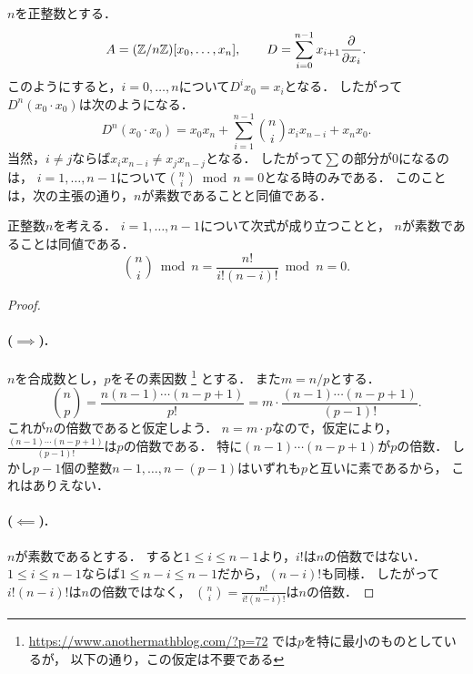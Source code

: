 \documentclass[a4paper]{jsarticle}
\begin{document}
\begin{Example}
    $n$を正整数とする．
    \[
        A=(\mathbb{Z}/n\mathbb{Z})[x_0,\dots,x_n],
        \hspace{20pt}
        D=\sum_{i=0}^{n-1} x_{i+1} \frac{\partial}{\partial x_{i}}.
    \]
    このようにすると，$i=0,\dots,n$について$D^i x_0=x_{i}$となる．
    したがって$D^n(x_0 \cdot x_0)$は次のようになる．
    \[ D^n(x_0 \cdot x_0)=x_0 x_n + \sum_{i=1}^{n-1} \binom{n}{i} x_i x_{n-i} + x_n x_0. \]
    当然，$i \neq j$ならば$x_i x_{n-i} \neq x_j x_{n-j}$となる．
    したがって$\sum$の部分が$0$になるのは，
    $i=1,\dots,n-1$について$\binom{n}{i} \bmod n=0$となる時のみである．
    このことは，次の主張の通り，$n$が素数であることと同値である．
\end{Example}

\begin{Prop}
    正整数$n$を考える．
    $i=1,\dots,n-1$について次式が成り立つことと，
    $n$が素数であることは同値である．
    \[ \binom{n}{i} \bmod n=\frac{n!}{i! (n-i)!} \bmod n=0. \]
\end{Prop}
\begin{proof}
    \paragraph{($\implies$).}
    $n$を合成数とし，$p$をその素因数
    \footnote
    {
        \url{https://www.anothermathblog.com/?p=72}
        では$p$を特に最小のものとしているが，
        以下の通り，この仮定は不要である
    }
    とする．
    また$m=n/p$とする．
    \[
        \binom{n}{p}
        =\frac{n(n-1)\cdots(n-p+1)}{p!}
        =m \cdot \frac{(n-1)\cdots(n-p+1)}{(p-1)!}.
    \]
    これが$n$の倍数であると仮定しよう．
    $n=m \cdot p$なので，仮定により，
    $\frac{(n-1)\cdots(n-p+1)}{(p-1)!}$は$p$の倍数である．
    特に$(n-1)\cdots(n-p+1)$が$p$の倍数．
    しかし$p-1$個の整数$n-1, \dots, n-(p-1)$はいずれも$p$と互いに素であるから，
    これはありえない．

    \paragraph{($\impliedby$).}
    $n$が素数であるとする．
    すると$1 \leq i \leq n-1$より，$i!$は$n$の倍数ではない．
    $1 \leq i \leq n-1$ならば$1 \leq n-i \leq n-1$だから，$(n-i)!$も同様．
    したがって$i! (n-i)!$は$n$の倍数ではなく，
    $\binom{n}{i}=\frac{n!}{i! (n-i)!}$は$n$の倍数．
\end{proof}
\end{document}
